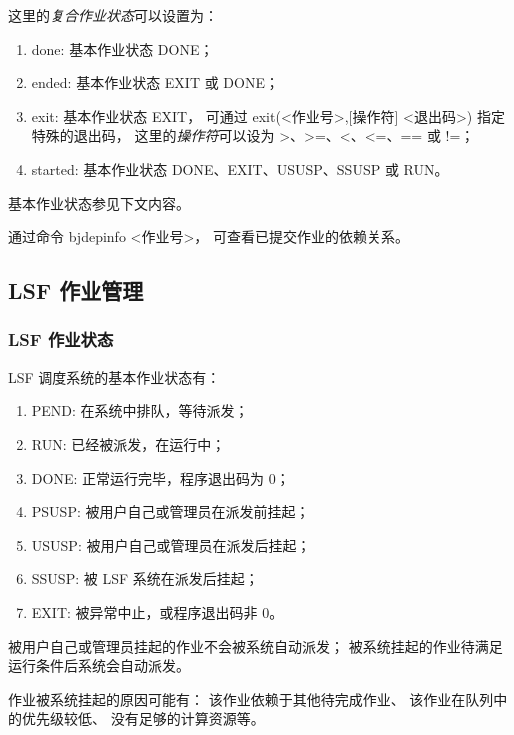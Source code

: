 \documentclass[UTF8]{ctexart}
\newcommand{\mynnote}[1]{\colorbox{gray!15}{\color{blue!65}#1}}
\begin{document}
这里的{\em 复合作业状态}可以设置为：
\begin{enumerate}[\hspace{15mm}（1）]
  \item done: 基本作业状态 DONE；
  \item ended: 基本作业状态 EXIT 或 DONE；
  \item exit: 基本作业状态 EXIT，
    可通过 \mynnote{exit(<作业号>,[操作符] <退出码>)} 指定特殊的退出码，
    这里的{\em 操作符}可以设为 >、>=、<、<=、== 或 !=；
  \item started: 基本作业状态 DONE、EXIT、USUSP、SSUSP 或 RUN。
\end{enumerate}
基本作业状态参见下文内容。

通过命令 \mynnote{bjdepinfo <作业号>}，
可查看已提交作业的依赖关系。

\subsection{LSF 作业管理}
\subsubsection{LSF 作业状态}
LSF 调度系统的基本作业状态有：
\begin{enumerate}[\hspace{15mm}（1）]
  \item PEND: 在系统中排队，等待派发；
  \item RUN: 已经被派发，在运行中；
  \item DONE: 正常运行完毕，程序退出码为 0；
  \item PSUSP: 被用户自己或管理员在派发前挂起；
  \item USUSP: 被用户自己或管理员在派发后挂起；
  \item SSUSP: 被 LSF 系统在派发后挂起；
  \item EXIT: 被异常中止，或程序退出码非 0。
\end{enumerate}

被用户自己或管理员挂起的作业不会被系统自动派发；
被系统挂起的作业待满足运行条件后系统会自动派发。

作业被系统挂起的原因可能有：
该作业依赖于其他待完成作业、
该作业在队列中的优先级较低、
没有足够的计算资源等。
\end{document}
